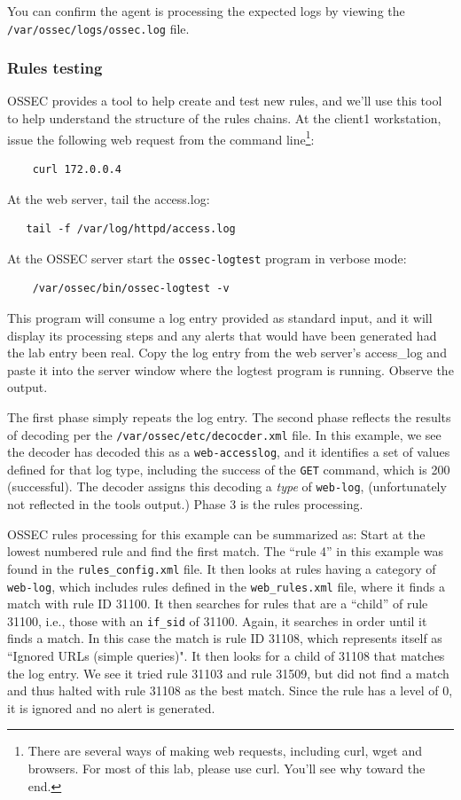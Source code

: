 You can confirm the agent is processing the expected logs by viewing the {\tt /var/ossec/logs/ossec.log} file.

\subsubsection{Rules testing}
OSSEC provides a tool to help create and test new rules, and we'll use this tool to help understand the structure
of the rules chains.  At the client1 workstation, issue the following web request from the command line\footnote{There
are several ways of making web requests, including curl, wget and browsers.  For most of this lab, please use curl.
You'll see why toward the end.}:
\begin{verbatim}
    curl 172.0.0.4
\end{verbatim}
\noindent At the web server, tail the access.log:
\begin{verbatim}
   tail -f /var/log/httpd/access.log
\end{verbatim}
\noindent At the OSSEC server start the {\tt ossec-logtest} program in verbose mode:
\begin{verbatim}
    /var/ossec/bin/ossec-logtest -v
\end{verbatim}
\noindent  This program will consume a log entry provided as standard input, and it will display its processing
steps and any alerts that would have been generated had the lab entry been real.  Copy the log entry from the web server's
access\_log and paste it into the server window where the logtest program is running.  Observe the output.

The first phase simply repeats the log entry.   The second phase reflects the results of decoding per the {\tt /var/ossec/etc/decocder.xml} file.  In this example, we
see the decoder has decoded this as a {\tt web-accesslog}, and it identifies a set of values defined for that log type,
including the success of the {\tt GET} command, which is 200 (successful).  The decoder assigns this decoding a
\textit{type} of {\tt web-log}, (unfortunately not reflected in the tools output.)   Phase 3 is the rules processing.

OSSEC rules processing for this example can be summarized 
as:  Start at the lowest numbered rule and find the first match. The ``rule 4''
in this example was found in the {\tt rules\_config.xml} file.  It then looks at rules having a category of 
{\tt web-log}, which includes rules defined in the {\tt web\_rules.xml} file, where it finds a match with rule ID 
31100.  It then searches for rules that are a ``child'' of rule 31100, i.e., those with an {\tt if\_sid} of 31100.
Again, it searches in order until it finds a match.  In this case the match is rule ID 31108, which represents itself
as ``Ignored URLs (simple queries)".  It then looks for a child of 31108 that matches the log entry.  We see it
tried rule 31103 and rule 31509, but did not find a match and thus halted with rule 31108 as the best match.
Since the rule has a level of 0, it is ignored and no alert is generated.

